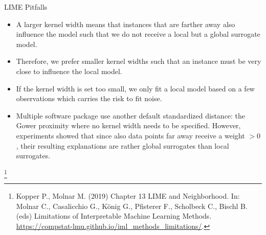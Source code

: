 \documentclass[11pt,compress,t,notes=noshow, aspectratio=169, xcolor=table]{beamer}
\begin{document}
\begin{vbframe}[allowframebreaks]{LIME Pitfalls}
\begin{itemize}
\begin{center}
     	\end{center}
     \item A larger kernel width means that instances that are farther away also influence the model such that we do not receive a local but a global surrogate model. 
     \item Therefore, we prefer smaller kernel widths such that an instance must be very close to influence the local model.  
     \item If the kernel width is set too small, we only fit a local model based on a few observations which carries the risk to fit noise.   
	\item Multiple software package use another default standardized distance: the Gower proximity where no kernel width needs to be specified. However, experiments showed that since also data points far away receive a weight $ > 0$, their resulting explanations are rather global surrogates than local surrogates.   
\end{itemize}
\vspace{0.3cm}

\footnote[frame]{Kopper P., Molnar M. (2019) Chapter 13 LIME and Neighborhood. In: Molnar C., Casalicchio G., König G., Pfisterer F., Scholbeck C., Bischl B. (eds) Limitations of Interpretable Machine Learning Methods. \url{https://compstat-lmu.github.io/iml_methods_limitations/}.}

\end{vbframe}
\end{document}
